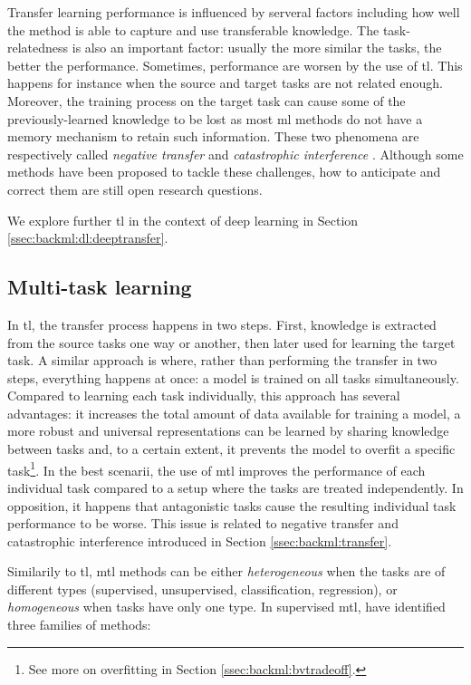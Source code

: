 Transfer learning performance is influenced by serveral factors including how well the method is able to capture and use transferable knowledge. The task-relatedness is also an important factor: usually the more similar the tasks, the better the performance. Sometimes, performance are worsen by the use of \acrlong{tl}. This happens for instance when the source and target tasks are not related enough. Moreover, the training process on the target task can cause some of the previously-learned knowledge to be lost as most \acrlong{ml} methods do not have a memory mechanism to retain such information. These two phenomena are respectively called \textit{negative transfer} \parencite{zhang2020overcoming} and \textit{catastrophic interference} \parencite{french1999catastrophic}. Although some methods have been proposed to tackle these challenges, how to anticipate and correct them are still open research questions.

We explore further \acrlong{tl} in the context of deep learning in Section \ref{ssec:backml:dl:deeptransfer}. 

\subsection{Multi-task learning}
\label{ssec:backml:mtl}

In \acrlong{tl}, the transfer process happens in two steps. First, knowledge is extracted from the source tasks one way or another, then later used for learning the target task. A similar approach is  where, rather than performing the transfer in two steps, everything happens at once: a model is trained on all tasks simultaneously. Compared to learning each task individually, this approach has several advantages: it increases the total amount of data available for training a model, a more robust and universal representations can be learned by sharing knowledge between tasks and, to a certain extent, it prevents the model to overfit a specific task\footnote{See more on overfitting in Section \ref{ssec:backml:bvtradeoff}.}. In the best scenarii, the use of \acrlong{mtl} improves the performance of each individual task compared to a setup where the tasks are treated independently. In opposition, it happens that antagonistic tasks cause the resulting individual task performance to be worse. This issue is related to negative transfer and catastrophic interference introduced in Section \ref{ssec:backml:transfer}. 

Similarily to \acrlong{tl}, \acrlong{mtl} methods can be either \textit{heterogeneous} when the tasks are of different types (\eg supervised, unsupervised, classification, regression), or \textit{homogeneous} when tasks have only one type. In supervised \acrlong{mtl}, \parencite{zhang2017survey} have identified three families of methods:

